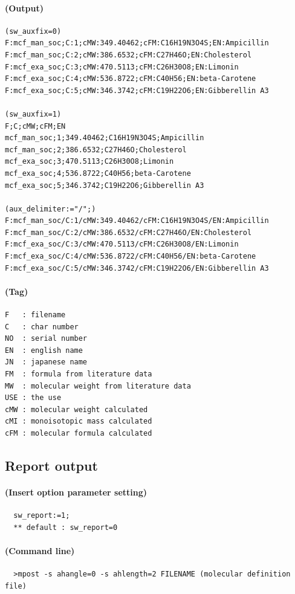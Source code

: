 \documentclass[a4paper]{article}
\begin{document}
\paragraph{(Output)}
\begin{verbatim}
(sw_auxfix=0)
F:mcf_man_soc;C:1;cMW:349.40462;cFM:C16H19N3O4S;EN:Ampicillin
F:mcf_man_soc;C:2;cMW:386.6532;cFM:C27H46O;EN:Cholesterol
F:mcf_exa_soc;C:3;cMW:470.5113;cFM:C26H30O8;EN:Limonin
F:mcf_exa_soc;C:4;cMW:536.8722;cFM:C40H56;EN:beta-Carotene
F:mcf_exa_soc;C:5;cMW:346.3742;cFM:C19H22O6;EN:Gibberellin A3

(sw_auxfix=1)
F;C;cMW;cFM;EN
mcf_man_soc;1;349.40462;C16H19N3O4S;Ampicillin
mcf_man_soc;2;386.6532;C27H46O;Cholesterol
mcf_exa_soc;3;470.5113;C26H30O8;Limonin
mcf_exa_soc;4;536.8722;C40H56;beta-Carotene
mcf_exa_soc;5;346.3742;C19H22O6;Gibberellin A3

(aux_delimiter:="/";)
F:mcf_man_soc/C:1/cMW:349.40462/cFM:C16H19N3O4S/EN:Ampicillin
F:mcf_man_soc/C:2/cMW:386.6532/cFM:C27H46O/EN:Cholesterol
F:mcf_exa_soc/C:3/cMW:470.5113/cFM:C26H30O8/EN:Limonin
F:mcf_exa_soc/C:4/cMW:536.8722/cFM:C40H56/EN:beta-Carotene
F:mcf_exa_soc/C:5/cMW:346.3742/cFM:C19H22O6/EN:Gibberellin A3
\end{verbatim}
\paragraph{(Tag)}
\begin{verbatim}
F   : filename
C   : char number
NO  : serial number
EN  : english name
JN  : japanese name
FM  : formula from literature data
MW  : molecular weight from literature data
USE : the use
cMW : molecular weight calculated
cMI : monoisotopic mass calculated
cFM : molecular formula calculated
\end{verbatim}
\newpage
\noindent%
\subsection{Report output}
\paragraph{(Insert option parameter setting)}
\begin{verbatim}
  sw_report:=1;
  ** default : sw_report=0
\end{verbatim}
\paragraph{(Command line)}
\begin{verbatim}
  >mpost -s ahangle=0 -s ahlength=2 FILENAME (molecular definition file)
\end{verbatim}
\end{document}
